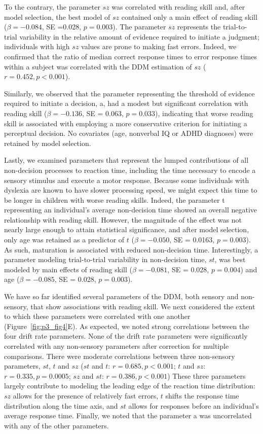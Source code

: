 \documentclass[../uwthesis.tex]{subfiles}
\begin{document}
To the contrary, the parameter $sz$ was correlated with reading skill and, after model selection, the best model of $sz$ contained only a main effect of reading skill ($\beta = -0.084$, SE =0.028, $p = 0.003$). The parameter $sz$ represents the trial-to-trial variability in the relative amount of evidence required to initiate a judgment; individuals with high $sz$ values are prone to
making fast errors. Indeed, we confirmed that the ratio of median correct response times to error response times within a subject was correlated with the DDM estimation of $sz$ ($r = 0.452, p<0.001$).

Similarly, we observed that the parameter representing the threshold of evidence required to initiate a decision, a, had a modest but significant correlation with reading skill ($\beta = -0.136$, SE = 0.063, $p = 0.033$), indicating that worse reading skill is associated with employing a more
conservative criterion for initiating a perceptual decision. No covariates (age, nonverbal IQ or ADHD diagnoses) were retained by model selection.

Lastly, we examined parameters that represent the lumped contributions of all non-decision processes to reaction time, including the time necessary to encode a sensory stimulus and execute a motor response. Because some individuals with dyslexia are known to have slower processing speed, we might expect this time to be longer in children with worse reading skills. Indeed, the
parameter t representing an individual’s average non-decision time showed an overall negative relationship with reading skill. However, the magnitude of the effect was not nearly large enough to attain statistical significance, and after model selection, only age was retained as a predictor of
$t$ ($\beta = -0.050$, SE = 0.0163, $p = 0.003$). As such, maturation is associated with reduced non-decision time. Interestingly, a parameter modeling trial-to-trial variability in non-decision time, $st$, was best modeled by main effects of reading skill ($\beta = -0.081$, SE = 0.028, $p = 0.004$) and
age ($\beta = -0.085$, SE = 0.028, $p = 0.003$).

We have so far identified several parameters of the DDM, both sensory and non-sensory, that show associations with reading skill. We next considered the extent to which these parameters were correlated with one another (Figure~\ref{fig:p3_fig4}E). As expected, we noted strong correlations between
the four drift rate parameters. None of the drift rate parameters were significantly correlated with any non-sensory parameters after correction for multiple comparisons. There were moderate correlations between three non-sensory parameters, $st$, $t$ and $sz$ ($st$ and $t$: $r = 0.685, p <0.001$; $t$ and $sz$: $r = 0.335, p = 0.0005$; $sz$ and $st$: $r = 0.386, p < 0.001$) These three parameters largely contribute to modeling the leading edge of the reaction time distribution: $sz$ allows for the presence of relatively fast errors, $t$ shifts the response time distribution along the time axis, and $st$ allows for responses before an individual’s average response time. Finally, we noted that the parameter a was uncorrelated with any of the other parameters.
\end{document}
